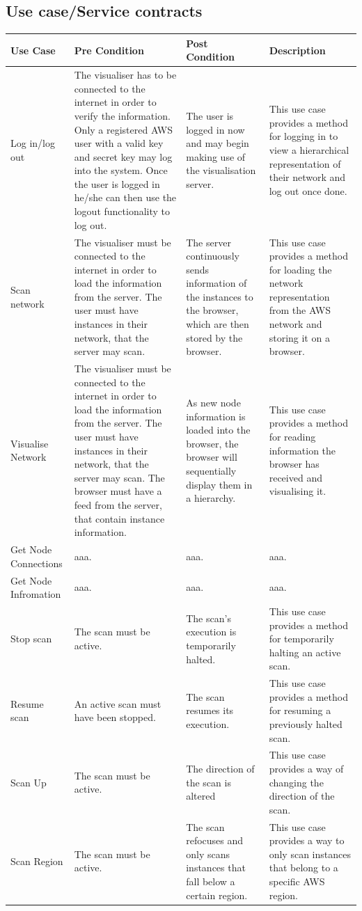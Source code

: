 \documentclass[a4paper,12pt]{report}
\begin{document}
\subsection{Use case/Service contracts}
\begin{center}
  \begin{longtable}{| p{3cm} | p{4cm} | p{4cm} | p{4cm} |}
    \hline
    Use Case & Pre Condition & Post Condition & Description \\ 
    \hline \hline
    Log in/log out & The visualiser has to be connected to the internet in order to verify the information. Only a registered AWS user with a valid key and secret key may log into the system. Once the user is logged in he/she can then use the logout functionality to log out. & The user is logged in now and may begin making use of the visualisation server. & This use case provides a method for logging in to view a hierarchical representation of their network and log out once done.\\ 
    \hline
    Scan network & The visualiser must be connected to the internet in order to load the information from the server. The user must have instances in their network, that the server may scan. & The server continuously sends information of the instances to the browser, which are then stored by the browser. & This use case provides a method for loading the network representation from the AWS network and storing it on a browser. \\ 
    \hline
    Visualise Network &  The visualiser must be connected to the internet in order to load the information from the server. The user must have instances in their network, that the server may scan. The browser must have a feed from the server, that contain instance information. & As new node information is loaded into the browser, the browser will sequentially display them in a hierarchy.  &  This use case provides a method for reading information the browser has received and visualising it.\\ 
    \hline
    
    Get Node Connections &  aaa. & aaa.  &  aaa.\\ 
    \hline
     Get Node Infromation &  aaa. & aaa.  &  aaa.\\ 
    \hline
    
    Stop scan & The scan must be active. & The scan's execution is temporarily halted.  & This use case provides a method for temporarily halting an active scan.\\ \hline
    Resume scan & An active scan must have been stopped. & The scan resumes its execution. &  This use case provides a method for resuming a previously halted scan.\\ 
    \hline
	Scan Up & The scan must be active. & The direction of the scan is altered & This use case provides a way of changing the direction of the scan.\\ 
	\hline
    Scan Region & The scan must be active. & The scan refocuses and only scans instances that fall below a certain region. & This use case provides a way to only scan instances that belong to a specific AWS region.\\ \hline
    

\end{longtable}
\end{center}
\end{document}
